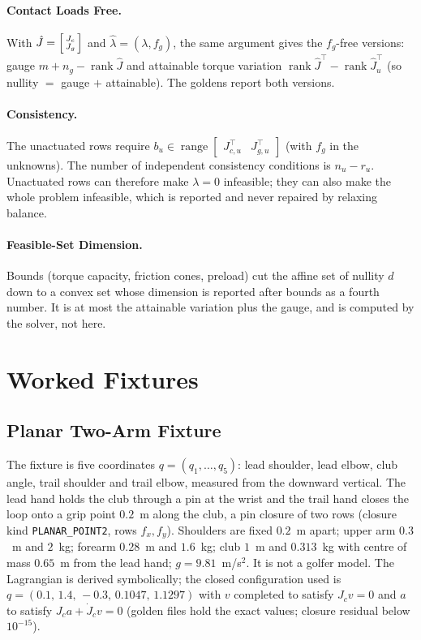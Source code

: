 \documentclass[11pt,a4paper]{article}
\newcommand{\rank}{\operatorname{rank}}
\newcommand{\range}{\operatorname{range}}
\begin{document}
\paragraph{Contact Loads Free.}
With $\hat J=\begin{bsmallmatrix}J_c\\J_g\end{bsmallmatrix}$ and
$\hat\lambda=(\lambda,f_g)$, the same argument gives the $f_g$-free versions:
gauge $m+n_g-\rank\hat J$ and attainable torque variation
$\rank\hat J^{\top}-\rank\hat J_u^{\top}$ (so nullity $=$ gauge $+$ attainable).
The goldens report both versions.

\paragraph{Consistency.}
The unactuated rows require $b_u\in\range\begin{bmatrix}J_{c,u}^{\top}&
J_{g,u}^{\top}\end{bmatrix}$ (with $f_g$ in the unknowns).  The number of
independent consistency conditions is $n_u-r_u$.  Unactuated rows can therefore
make $\lambda=0$ infeasible; they can also make the whole problem infeasible,
which is reported and never repaired by relaxing balance.

\paragraph{Feasible-Set Dimension.}
Bounds (torque capacity, friction cones, preload) cut the affine set of
nullity $d$ down to a convex set whose dimension is reported after bounds as a
fourth number.  It is at most the attainable variation plus the gauge, and is
computed by the solver, not here.

\section{Worked Fixtures}
\label{sec:fixtures}

\subsection{Planar Two-Arm Fixture}

The fixture is five coordinates $q=(q_1,\dots,q_5)$: lead shoulder, lead
elbow, club angle, trail shoulder and trail elbow, measured from the downward
vertical.  The lead hand holds the club through a pin at the wrist and the trail
hand closes the loop onto a grip point $0.2$~m along the club, a pin closure of
two rows (closure kind \texttt{PLANAR\_POINT2}, rows $f_x,f_y$).  Shoulders are
fixed $0.2$~m apart; upper arm $0.3$~m and $2$~kg; forearm $0.28$~m and
$1.6$~kg; club $1$~m and $0.313$~kg with centre of mass $0.65$~m from the lead
hand; $g=9.81$~m/s$^2$.  It is not a golfer model.  The Lagrangian is derived
symbolically; the closed configuration used is
$q=(0.1,\,1.4,\,-0.3,\,0.1047,\,1.1297)$ with $v$ completed to satisfy
$J_cv=0$ and $a$ to satisfy $J_ca+\dot J_cv=0$ (golden files hold the exact
values; closure residual below $10^{-15}$).
\end{document}
